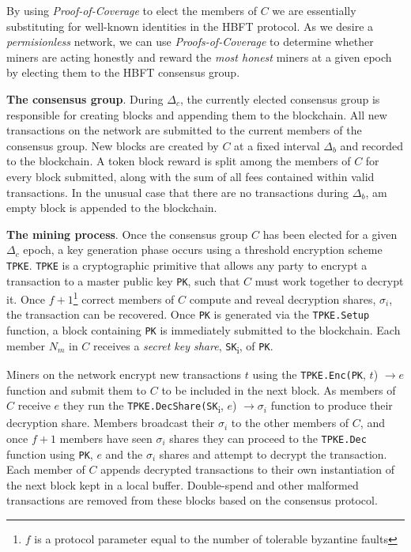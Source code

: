 \documentclass[10pt, nonatbib, nocopyrightspace, reprint]{sigplanconf}
\begin{document}
By using \emph{Proof-of-Coverage} to elect the members of $C$ we are essentially substituting for well-known identities in the HBFT protocol. As we desire a \emph{permisionless} network, we can use \emph{Proofs-of-Coverage} to determine whether miners are acting honestly and reward the \emph{most honest} miners at a given epoch by electing them to the HBFT consensus group.

\textbf{The consensus group}. During $\Delta_c$, the currently elected consensus group is responsible for creating blocks and appending them to the blockchain. All new transactions on the network are submitted to the current members of the consensus group. New blocks are created by $C$ at a fixed interval $\Delta_b$ and recorded to the blockchain. A token block reward is split among the members of $C$ for every block submitted, along with the sum of all fees contained within valid transactions. In the unusual case that there are no transactions during $\Delta_b$, am empty block is appended to the blockchain.

\textbf{The mining process}. Once the consensus group $C$ has been elected for a given $\Delta_c$ epoch, a key generation phase occurs using a threshold encryption scheme \verb|TPKE|. \verb|TPKE| is a cryptographic primitive that allows any party to encrypt a transaction to a master public key \verb|PK|, such that $C$ must work together to decrypt it. Once $f + 1$\footnote{$f$ is a protocol parameter equal to the number of tolerable byzantine faults} correct members of $C$ compute and reveal decryption shares, $\sigma_i$, the transaction can be recovered. Once \verb|PK| is generated via the \verb|TPKE.Setup| function, a block containing \verb|PK| is immediately submitted to the blockchain. Each member $N_m$ in $C$ receives a \emph{secret key share}, \verb|SK|\textsubscript{i}, of \verb|PK|. 

Miners on the network encrypt new transactions $t$ using the \verb|TPKE.Enc(PK|, $t$) $\rightarrow e$ function and submit them to $C$ to be included in the next block. As members of $C$ receive $e$ they run the \verb|TPKE.DecShare(SK|\textsubscript{i}, $e$) $\rightarrow \sigma_i$ function to produce their decryption share. Members broadcast their $\sigma_i$ to the other members of $C$, and once $f + 1$ members have seen $\sigma_i$ shares they can proceed to the \verb|TPKE.Dec| function using \verb|PK|, $e$ and the $\sigma_i$ shares and attempt to decrypt the transaction. Each member of $C$ appends decrypted transactions to their own instantiation of the next block kept in a local buffer. Double-spend and other malformed transactions are removed from these blocks based on the consensus protocol.
\end{document}
